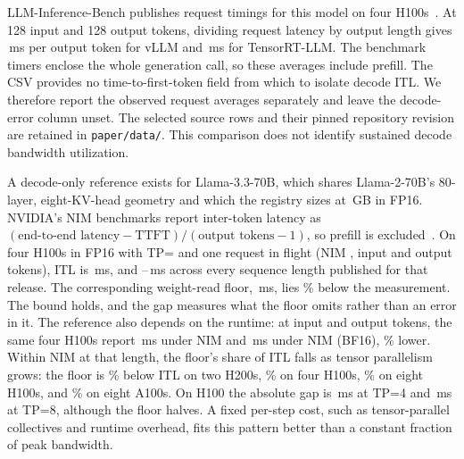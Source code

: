 \documentclass[10pt,twocolumn]{article}
\begin{document}
LLM-Inference-Bench publishes request timings for this model on four H100s~\citep{chittyvenkata2024llm}. At 128 input and 128 output tokens, dividing request latency by output length gives \AnchorTwoVllmRequestAverageMs\,ms per output token for vLLM and \AnchorTwoTrtRequestAverageMs\,ms for TensorRT-LLM. The benchmark timers enclose the whole generation call, so these averages include prefill. The CSV provides no time-to-first-token field from which to isolate decode ITL. We therefore report the observed request averages separately and leave the decode-error column unset. The selected source rows and their pinned repository revision are retained in \texttt{paper/data/}. This comparison does not identify sustained decode bandwidth utilization.

A decode-only reference exists for Llama-3.3-70B, which shares Llama-2-70B's 80-layer, eight-KV-head geometry and which the registry sizes at \AnchorTwoItlWeightsGB\,GB in FP16. NVIDIA's NIM benchmarks report inter-token latency as $(\text{end-to-end latency}-\text{TTFT})/(\text{output tokens}-1)$, so prefill is excluded~\citep{nvidia2026nimbench}. On four H100s in FP16 with TP=\AnchorTwoItlTpDegree{} and one request in flight (NIM \AnchorTwoItlNimVersion, \AnchorTwoItlPromptTokens{} input and \AnchorTwoItlOutputTokens{} output tokens), ITL is \AnchorTwoItlMeasuredMs\,ms, and \AnchorTwoItlMinMs--\AnchorTwoItlMaxMs\,ms across every sequence length published for that release. The corresponding weight-read floor, \AnchorTwoItlFloorMs\,ms, lies \AnchorTwoItlFloorBelowPct\% below the measurement. The bound holds, and the gap measures what the floor omits rather than an error in it. The reference also depends on the runtime: at \AnchorTwoItlSweepTokens{} input and output tokens, the same four H100s report \AnchorTwoItlEarlierMs\,ms under NIM \AnchorTwoItlNimVersion{} and \AnchorTwoItlLaterMs\,ms under NIM \AnchorTwoItlLaterVersion{} (BF16), \AnchorTwoItlRuntimeShiftPct\% lower. Within NIM \AnchorTwoItlLaterVersion{} at that length, the floor's share of ITL falls as tensor parallelism grows: the floor is \AnchorTwoItlGapTpTwoPct\% below ITL on two H200s, \AnchorTwoItlGapTpFourPct\% on four H100s, \AnchorTwoItlGapTpEightPct\% on eight H100s, and \AnchorTwoItlGapAhundredPct\% on eight A100s. On H100 the absolute gap is \AnchorTwoItlResidualTpFourMs\,ms at TP=4 and \AnchorTwoItlResidualTpEightMs\,ms at TP=8, although the floor halves. A fixed per-step cost, such as tensor-parallel collectives and runtime overhead, fits this pattern better than a constant fraction of peak bandwidth.
\end{document}
